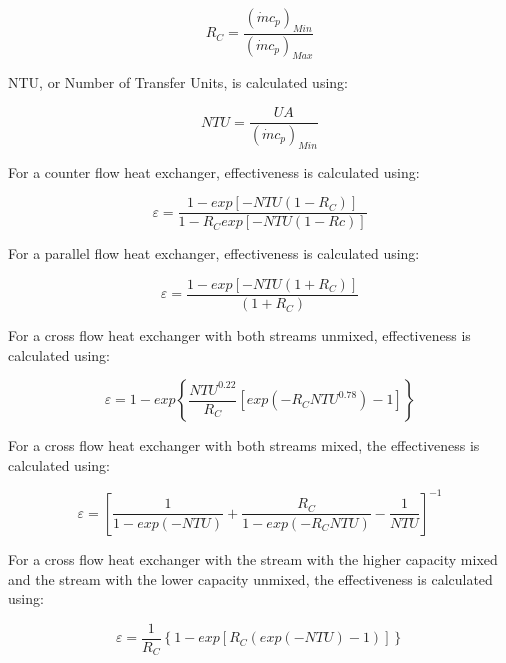 \begin{equation}
{R_C} = \frac{{{{\left( {\dot m{c_p}} \right)}_{Min}}}}{{{{\left( {\dot m{c_p}} \right)}_{Max}}}}
\end{equation}

NTU, or Number of Transfer Units, is calculated using:

\begin{equation}
NTU = \frac{{UA}}{{{{\left( {\dot m{c_p}} \right)}_{Min}}}}
\end{equation}

For a counter flow heat exchanger, effectiveness is calculated using:

\begin{equation}
\varepsilon  = \frac{{1 - exp\left[ { - NTU\left( {1 - {R_C}} \right)} \right]}}{{1 - {R_C}exp\left[ { - NTU\left( {1 - Rc} \right)} \right]}}
\end{equation}

For a parallel flow heat exchanger, effectiveness is calculated using:

\begin{equation}
\varepsilon  = \frac{{1 - exp\left[ { - NTU\left( {1 + {R_C}} \right)} \right]}}{{\left( {1 + {R_C}} \right)}}
\end{equation}

For a cross flow heat exchanger with both streams unmixed, effectiveness is calculated using:

\begin{equation}
\varepsilon  = 1 - exp\left\{ {\frac{{NT{U^{0.22}}}}{{{R_C}}}\left[ {exp\left( { - {R_C}NT{U^{0.78}}} \right) - 1} \right]} \right\}
\end{equation}

For a cross flow heat exchanger with both streams mixed, the effectiveness is calculated using:

\begin{equation}
\varepsilon  = {\left[ {\frac{1}{{1 - exp\left( { - NTU} \right)}} + \frac{{{R_C}}}{{1 - exp\left( { - {R_C}NTU} \right)}} - \frac{1}{{NTU}}} \right]^{ - 1}}
\end{equation}

For a cross flow heat exchanger with the stream with the higher capacity mixed and the stream with the lower capacity unmixed, the effectiveness is calculated using:

\begin{equation}
\varepsilon  = \frac{1}{{{R_C}}}\left\{ {1 - exp\left[ {{R_C}\left( {exp\left( { - NTU} \right) - 1} \right)} \right]} \right\}
\end{equation}

